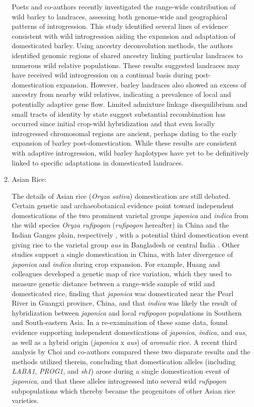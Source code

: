 \documentclass[11pt]{article}
\begin{document}
\begin{enumerate}
Poets and co-authors \cite{Poets2015} recently investigated the range-wide contribution of wild barley to landraces, assessing both genome-wide and geographical patterns of introgression.
This study identified several lines of evidence consistent with wild introgression aiding the expansion and adaptation of domesticated barley.
Using ancestry deconvolution methods, the authors identified genomic regions of shared ancestry linking particular landraces to numerous wild relative populations.
These results suggested landraces may have received wild introgression on a continual basis during post-domestication expansion.
However, barley landraces also showed an excess of ancestry from nearby wild relatives, indicating a prevalence of local and potentially adaptive gene flow.
Limited admixture linkage disequilibrium and small tracts of identity by state suggest substantial recombination has occurred since initial crop-wild hybridization and that even locally introgressed chromosomal regions are ancient, perhaps dating to the early expansion of barley post-domestication.
While these results are consistent with adaptive introgression, wild barley haplotypes have yet to be definitively linked to specific adaptations in domesticated landraces.

\item{Asian Rice:}

The details of Asian rice (\emph{Oryza sativa}) domestication are still debated.
Certain genetic and archaeobotanical evidence point toward independent domestications of the two prominent varietal groups \emph{japonica} and \emph{indica} from the wild species \emph{Oryza rufipogon} (\emph{rufipogon} hereafter) in China and the Indian Ganges plain, respectively \cite{fuller2010consilience}, with a potential third domestication event giving rise to the varietal group \emph{aus} in Bangladesh or central India \cite{civavn2015three}.
Other studies support a single domestication in China, with later divergence of \emph{japonica} and \emph{indica} \cite{molina2011molecular, Huang2012} during crop expansion.
For example, Huang and colleagues \cite{Huang2012} developed a genetic map of rice variation, which they used to measure genetic distance between a range-wide sample of wild and domesticated rice, finding that \emph{japonica} was domesticated near the Pearl River in Guangxi province, China, and that \emph{indica} was likely the result of hybridization between \emph{japonica} and local \emph{rufipogon} populations in Southern and South-eastern Asia.
In a re-examination of these same data, \cite{civavn2015three} found evidence supporting independent domestications of \emph{japonica}, \emph{indica}, and \emph{aus}, as well as a hybrid origin (\emph{japonica} x \emph{aus}) of \emph{aromatic} rice.
A recent third analysis by Choi and co-authors \cite{choi2018multiple} compared these two disparate results and the methods utilized therein, concluding that domestication alleles (including \emph{LABA1}, \emph{PROG1}, and \emph{sh1}) arose during a single domestication event of \emph{japonica}, and that these alleles introgressed into several wild \emph{rufipogon} subpopulations which thereby became the progenitors of other Asian rice varieties.


\end{enumerate}
\end{document}
